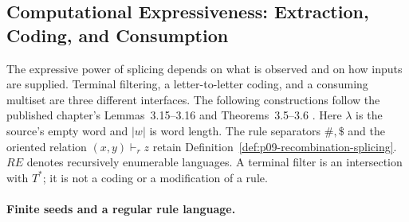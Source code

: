 \subsection{Computational Expressiveness: Extraction, Coding, and Consumption}
\label{sec:p09-recombination-computation}

The expressive power of splicing depends on what is observed and on how
inputs are supplied. Terminal filtering, a letter-to-letter coding, and a
consuming multiset are three different interfaces. The following constructions
follow the published chapter's Lemmas~3.15--3.16 and Theorems~3.5--3.6
\cite[pp.~313--323]{HeadPaunPixton1997RecombinationIntake}.
Here \(\lambda\) is the source's empty word and \(|w|\) is word length.
The rule separators \(\#,\$\) and the oriented relation
\((x,y)\vdash_r z\) retain Definition~\ref{def:p09-recombination-splicing}.
\(RE\) denotes recursively enumerable languages. A terminal filter is an
intersection with \(T^*\); it is not a coding or a modification of a rule.

\paragraph{Finite seeds and a regular rule language.}

